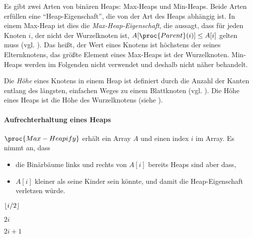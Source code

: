Es gibt zwei Arten von binären Heaps: Max-Heaps und Min-Heaps. Beide Arten erfüllen eine \enquote{Heap-Eigenschaft}, die von der Art des Heaps abhängig ist. In einem Max-Heap ist dies die \emph{Max-Heap-Eigenschaft}, die aussagt, dass für jeden Knoten $i$, der nicht der Wurzelknoten ist, $A[\proc{Parent}(i)] \leq A[i]$ gelten muss (vgl. \cite[92]{hsr1997}). Das heißt, der Wert eines Knotens ist höchstens der seines Elternknotens, das größte Element eines Max-Heaps ist der Wurzelknoten. Min-Heaps werden im Folgenden nicht verwendet und deshalb nicht näher behandelt.

Die \emph{Höhe} eines Knotens in einem Heap ist definiert durch die Anzahl der Kanten entlang des längsten, einfachen Weges zu einem Blattknoten (vgl. \cite[153]{clrs2001}). Die Höhe eines Heaps ist die Höhe des Wurzelknotens (siehe ).



\paragraph{Aufrechterhaltung eines Heaps}

$\proc{Max-Heapify}$ erhält ein Array $A$ und einen index $i$ im Array. Es nimmt an, dass
\begin{itemize}
    \item die Binärbäume links und rechts von $A[i]$ bereits Heaps sind aber dass,
    \item $A[i]$ kleiner als seine Kinder sein könnte, und damit die Heap-Eigenschaft verletzen würde.
\end{itemize}

\begin{minipage}{\textwidth}
    \begin{minipage}[t]{.33\textwidth}
        \begin{codebox}
            \li \Return $\left\lfloor i/2 \right\rfloor$
        \end{codebox}
    \end{minipage}
    \begin{minipage}[t]{.33\textwidth}
        \begin{codebox}
            \li \Return $2i$
        \end{codebox}
    \end{minipage}
    \begin{minipage}[t]{.33\textwidth}
        \begin{codebox}
            \li \Return $2i + 1$
        \end{codebox}
    \end{minipage}
\end{minipage}

